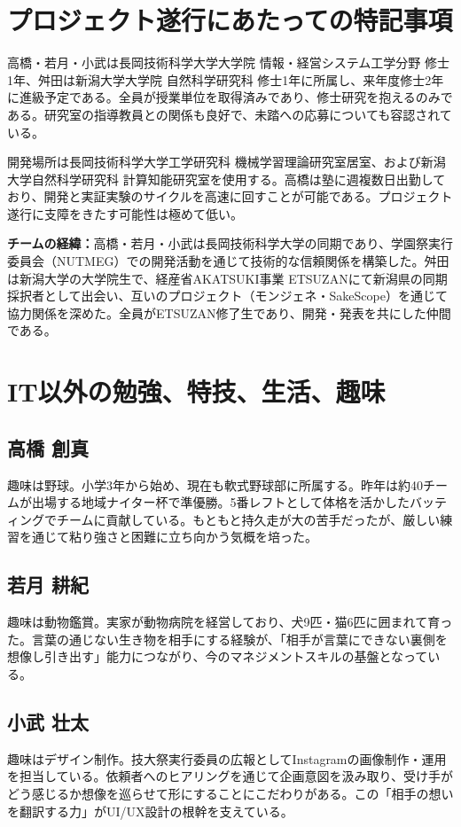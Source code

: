 \documentclass[paper=a4,fontsize=10.5bp,jafontsize=10.5bp]{jlreq}
\begin{document}
\section{プロジェクト遂行にあたっての特記事項}

高橋・若月・小武は長岡技術科学大学大学院 情報・経営システム工学分野 修士1年、舛田は新潟大学大学院 自然科学研究科 修士1年に所属し、来年度修士2年に進級予定である。全員が授業単位を取得済みであり、修士研究を抱えるのみである。研究室の指導教員との関係も良好で、未踏への応募についても容認されている。

開発場所は長岡技術科学大学工学研究科 機械学習理論研究室居室、および新潟大学自然科学研究科 計算知能研究室を使用する。高橋は塾に週複数日出勤しており、開発と実証実験のサイクルを高速に回すことが可能である。プロジェクト遂行に支障をきたす可能性は極めて低い。

\noindent\textbf{チームの経緯：}高橋・若月・小武は長岡技術科学大学の同期であり、学園祭実行委員会（NUTMEG）での開発活動を通じて技術的な信頼関係を構築した。舛田は新潟大学の大学院生で、経産省AKATSUKI事業 ETSUZANにて新潟県の同期採択者として出会い、互いのプロジェクト（モンジェネ・SakeScope）を通じて協力関係を深めた。全員がETSUZAN修了生であり、開発・発表を共にした仲間である。

\section{IT以外の勉強、特技、生活、趣味}

\subsection*{高橋 創真}
趣味は野球。小学3年から始め、現在も軟式野球部に所属する。昨年は約40チームが出場する地域ナイター杯で準優勝。5番レフトとして体格を活かしたバッティングでチームに貢献している。もともと持久走が大の苦手だったが、厳しい練習を通じて粘り強さと困難に立ち向かう気概を培った。

\subsection*{若月 耕紀}
趣味は動物鑑賞。実家が動物病院を経営しており、犬9匹・猫6匹に囲まれて育った。言葉の通じない生き物を相手にする経験が、「相手が言葉にできない裏側を想像し引き出す」能力につながり、今のマネジメントスキルの基盤となっている。

\subsection*{小武 壮太}
趣味はデザイン制作。技大祭実行委員の広報としてInstagramの画像制作・運用を担当している。依頼者へのヒアリングを通じて企画意図を汲み取り、受け手がどう感じるか想像を巡らせて形にすることにこだわりがある。この「相手の想いを翻訳する力」がUI/UX設計の根幹を支えている。
\end{document}
